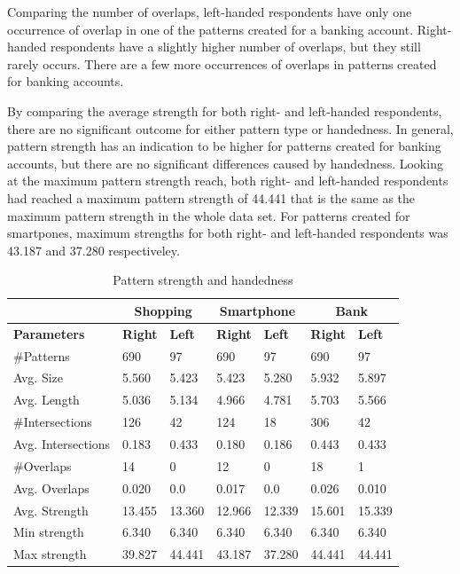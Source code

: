       Comparing the number of overlaps, left-handed respondents have only one occurrence of overlap in one of the patterns created for a banking account. Right-handed respondents have a slightly higher number of overlaps, but they still rarely occurs. There are a few more occurrences of overlaps in patterns created for banking accounts. 

      By comparing the average strength for both right- and left-handed respondents, there are no significant outcome for either pattern type or handedness. In general, pattern strength has an indication to be higher for patterns created for banking accounts, but there are no significant differences caused by handedness. Looking at the maximum pattern strength reach, both right- and left-handed respondents had reached a maximum pattern strength of 44.441 that is the same as the maximum pattern strength in the whole data set. For patterns created for smartpones, maximum strengths for both right- and left-handed respondents was 43.187 and 37.280 respectiveley. 

      \begin{table}[H]
        \centering
        \begin{tabular}{l || l | l || l | l || l | l }
          \hline
           & \multicolumn{2}{c||}{\bf Shopping} & \multicolumn{2}{c||}{\bf Smartphone} &\multicolumn{2}{c}{\bf Bank} \\ \hline
          {\bf Parameters}   & {\bf Right} & {\bf Left} & {\bf Right} & {\bf Left} & {\bf Right} & {\bf Left}\\ \hline
          \#Patterns         & 690    & 97      & 690     & 97      & 690    & 97     \\
          Avg. Size          & 5.560  & 5.423   & 5.423   & 5.280   & 5.932  & 5.897  \\
          Avg. Length        & 5.036  & 5.134   & 4.966   & 4.781   & 5.703  & 5.566  \\
          \#Intersections    & 126    & 42      & 124     & 18      & 306    & 42     \\
          Avg. Intersections & 0.183  & 0.433   & 0.180   & 0.186   & 0.443  & 0.433  \\
          \#Overlaps         & 14     & 0       & 12      & 0       & 18     & 1      \\
          Avg. Overlaps      & 0.020  & 0.0     & 0.017   & 0.0     & 0.026  & 0.010  \\ \hline
          Avg. Strength      & 13.455 & 13.360  & 12.966  & 12.339  & 15.601 & 15.339 \\ 
          Min strength       & 6.340  & 6.340   & 6.340   & 6.340   & 6.340  & 6.340  \\
          Max strength       & 39.827 & 44.441  & 43.187  & 37.280  & 44.441 & 44.441 \\ \hline
        \end{tabular}
        \caption{Pattern strength and handedness}
        \label{tab:handednessstrength} 
      \end{table}

